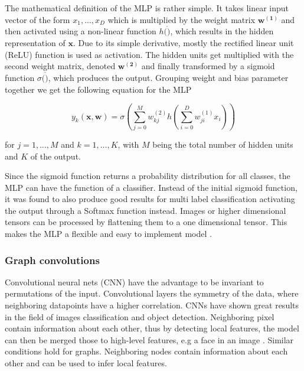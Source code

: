 The mathematical definition of the MLP is rather simple. It takes linear input vector of the form $x_1,...,x_D$ which is multiplied by the weight matrix $\mathbf{w^{(1)}}$ and then activated using a non-linear function $h(\dot)$, which results in the hidden representation of $\mathbf{x}$. Due to its simple derivative, mostly the rectified linear unit (ReLU) function is used as activation. The hidden units get multiplied with the second weight matrix, denoted $\mathbf{w^{(2)}}$ and finally transformed by a sigmoid function $\sigma(\dot)$, which produces the output. Grouping weight and bias parameter together we get the following equation for the MLP

\begin{equation}
    y_{k}(\mathbf{x}, \mathbf{w})=\sigma\left(\sum_{j=0}^{M} w_{k j}^{(2)} h\left(\sum_{i=0}^{D} w_{j i}^{(1)} x_{i}\right)\right)
\end{equation}

for $j=1, \ldots, M$ and $k=1, \ldots, K$, with $M$ being the total number of hidden units and $K$ of the output.

Since the sigmoid function returns a probability distribution for all classes, the MLP can have the function of a classifier. Instead of the initial sigmoid function, it was found to also produce good results for multi label classification activating the output through a Softmax function instead. Images or higher dimensional tensors can be processed by flattening them to a one dimensional tensor. This makes the MLP a flexible and easy to implement model \cite{bishop_pattern_2006}.


\subsubsection{Graph convolutions}
\label{ssec:gcn}

Convolutional neural nets (CNN) have the advantage to be invariant to permutations of the input. Convolutional layers the symmetry of the data, where neighboring datapoints have a higher correlation. CNNs have shown great results in the field of images classification and object detection. Neighboring pixel contain information about each other, thus by detecting local features, the model can then be merged those to high-level features, e.g a face in an image \cite{bishop_pattern_2006}. Similar conditions hold for graphs. Neighboring nodes contain information about each other and can be used to infer local features. 

